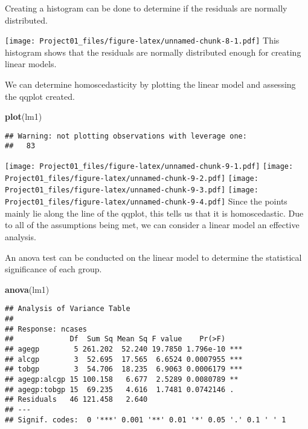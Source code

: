\documentclass[
]{article}
\newenvironment{Shaded}{\begin{snugshade}}{\end{snugshade}}
\newcommand{\AttributeTok}[1]{\textcolor[rgb]{0.13,0.29,0.53}{#1}}
\newcommand{\FunctionTok}[1]{\textcolor[rgb]{0.13,0.29,0.53}{\textbf{#1}}}
\newcommand{\NormalTok}[1]{#1}
\newcommand{\SpecialCharTok}[1]{\textcolor[rgb]{0.81,0.36,0.00}{\textbf{#1}}}
\newcommand{\StringTok}[1]{\textcolor[rgb]{0.31,0.60,0.02}{#1}}
\begin{document}
Creating a histogram can be done to determine if the residuals are
normally distributed.

\begin{Shaded}
\end{Shaded}

\texttt{[image: Project01\_files/figure-latex/unnamed-chunk-8-1.pdf]}
This histogram shows that the residuals are normally distributed enough
for creating linear models.

We can determine homoscedasticity by plotting the linear model and
assessing the qqplot created.

\begin{Shaded}
\begin{Highlighting}[]
\FunctionTok{plot}\NormalTok{(lm1)}
\end{Highlighting}
\end{Shaded}

\begin{verbatim}
## Warning: not plotting observations with leverage one:
##   83
\end{verbatim}

\texttt{[image: Project01\_files/figure-latex/unnamed-chunk-9-1.pdf]}
\texttt{[image: Project01\_files/figure-latex/unnamed-chunk-9-2.pdf]}
\texttt{[image: Project01\_files/figure-latex/unnamed-chunk-9-3.pdf]}
\texttt{[image: Project01\_files/figure-latex/unnamed-chunk-9-4.pdf]}
Since the points mainly lie along the line of the qqplot, this tells us
that it is homoscedastic. Due to all of the assumptions being met, we
can consider a linear model an effective analysis.

An anova test can be conducted on the linear model to determine the
statistical significance of each group.

\begin{Shaded}
\begin{Highlighting}[]
\FunctionTok{anova}\NormalTok{(lm1)}
\end{Highlighting}
\end{Shaded}

\begin{verbatim}
## Analysis of Variance Table
## 
## Response: ncases
##             Df  Sum Sq Mean Sq F value    Pr(>F)    
## agegp        5 261.202  52.240 19.7850 1.796e-10 ***
## alcgp        3  52.695  17.565  6.6524 0.0007955 ***
## tobgp        3  54.706  18.235  6.9063 0.0006179 ***
## agegp:alcgp 15 100.158   6.677  2.5289 0.0080789 ** 
## agegp:tobgp 15  69.235   4.616  1.7481 0.0742146 .  
## Residuals   46 121.458   2.640                      
## ---
## Signif. codes:  0 '***' 0.001 '**' 0.01 '*' 0.05 '.' 0.1 ' ' 1
\end{verbatim}
\end{document}
